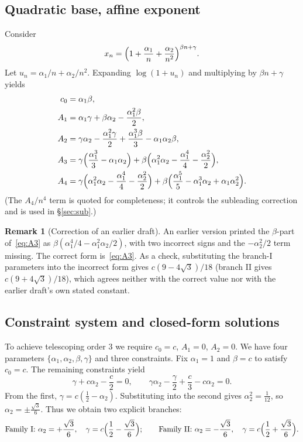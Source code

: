 \documentclass[11pt]{article}
\theoremstyle{definition}
\newtheorem{remark}[theorem]{Remark}
\begin{document}
\subsection{Quadratic base, affine exponent}
Consider
\[
  x_n = \Bigl(1 + \frac{\alpha_1}{n} + \frac{\alpha_2}{n^2}\Bigr)^{\beta n+\gamma}.
\]
Let $u_n = \alpha_1/n + \alpha_2/n^2$. Expanding $\log(1+u_n)$ and multiplying by
$\beta n + \gamma$ yields
\begin{align}
  c_0 &= \alpha_1\beta, \label{eq:c0}\\
  A_1 &= \alpha_1\gamma + \beta\alpha_2 - \frac{\alpha_1^2\beta}{2}, \label{eq:A1}\\
  A_2 &= \gamma\alpha_2 - \frac{\alpha_1^2\gamma}{2} + \frac{\alpha_1^3\beta}{3} - \alpha_1\alpha_2\beta, \label{eq:A2}\\
  A_3 &= \gamma\Bigl(\frac{\alpha_1^3}{3} - \alpha_1\alpha_2\Bigr)
        + \beta\Bigl(\alpha_1^2\alpha_2 - \frac{\alpha_1^4}{4} - \frac{\alpha_2^2}{2}\Bigr), \label{eq:A3}\\
  A_4 &= \gamma\Bigl(\alpha_1^2\alpha_2 - \frac{\alpha_1^4}{4} - \frac{\alpha_2^2}{2}\Bigr)
        + \beta\Bigl(\frac{\alpha_1^5}{5} - \alpha_1^3\alpha_2 + \alpha_1\alpha_2^2\Bigr). \label{eq:A4}
\end{align}
(The $A_4/n^4$ term is quoted for completeness; it controls the subleading
correction and is used in \S\ref{sec:sub}.)

\begin{remark}[Correction of an earlier draft]\label{rem:eq4}
An earlier version printed the $\beta$-part of~\eqref{eq:A3} as
$\beta(\alpha_1^4/4 - \alpha_1^2\alpha_2/2)$, with two incorrect signs and the
$- \alpha_2^2/2$ term missing. The correct form is~\eqref{eq:A3}. As a check,
substituting the branch-I parameters into the incorrect form gives
$c(9-4\sqrt3)/18$ (branch II gives $c(9+4\sqrt3)/18$), which agrees neither
with the correct value nor with the earlier draft's own stated constant.
\end{remark}

\subsection{Constraint system and closed-form solutions}
To achieve telescoping order $3$ we require $c_0=c$, $A_1=0$, $A_2=0$. We have
four parameters $\{\alpha_1,\alpha_2,\beta,\gamma\}$ and three constraints. Fix
$\alpha_1=1$ and $\beta=c$ to satisfy $c_0=c$. The remaining constraints yield
\[
  \gamma + c\alpha_2 - \frac{c}{2} = 0,
  \qquad
  \gamma\alpha_2 - \frac{\gamma}{2} + \frac{c}{3} - c\alpha_2 = 0.
\]
From the first, $\gamma = c(\tfrac12 - \alpha_2)$. Substituting into the second
gives $\alpha_2^2 = \tfrac1{12}$, so $\alpha_2 = \pm\tfrac{\sqrt3}{6}$. Thus we
obtain two explicit branches:
\[
  \text{Family I: } \alpha_2 = +\frac{\sqrt3}{6},\quad
    \gamma = c\Bigl(\frac12 - \frac{\sqrt3}{6}\Bigr);
  \qquad
  \text{Family II: } \alpha_2 = -\frac{\sqrt3}{6},\quad
    \gamma = c\Bigl(\frac12 + \frac{\sqrt3}{6}\Bigr).
\]
\end{document}
